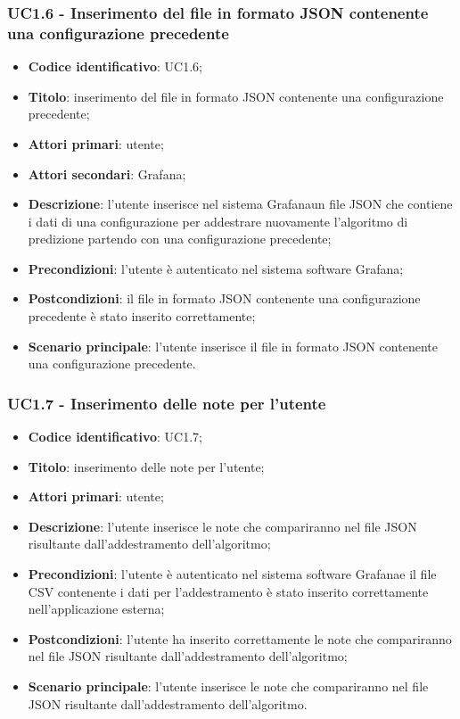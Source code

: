 \subsubsection{UC1.6 - Inserimento del file in formato JSON contenente una configurazione precedente}
\begin{itemize}
	\item \textbf{Codice identificativo}: UC1.6;
	\item \textbf{Titolo}: inserimento del file in formato JSON contenente una configurazione precedente;
	\item \textbf{Attori primari}: utente;
	\item \textbf{Attori secondari}: Grafana\glo;
	\item \textbf{Descrizione}: l'utente inserisce nel sistema Grafana\glosp un file JSON che contiene i dati di una configurazione per addestrare nuovamente l'algoritmo di predizione partendo con una configurazione precedente;
	\item \textbf{Precondizioni}: l'utente è autenticato nel sistema software Grafana\glo;
	\item \textbf{Postcondizioni}: il file in formato JSON contenente una configurazione precedente è stato inserito correttamente;
	\item \textbf{Scenario principale}: l'utente inserisce il file in formato JSON contenente una configurazione precedente.
\end{itemize}
\subsubsection{UC1.7 - Inserimento delle note per l'utente}
\begin{itemize}
	\item \textbf{Codice identificativo}: UC1.7;
	\item \textbf{Titolo}: inserimento delle note per l'utente;
	\item \textbf{Attori primari}: utente;
	\item \textbf{Descrizione}: l'utente inserisce le note che compariranno nel file JSON risultante dall'addestramento dell'algoritmo;
	\item \textbf{Precondizioni}: l'utente è autenticato nel sistema software Grafana\glosp e il file CSV contenente i dati per l'addestramento è stato inserito correttamente nell'applicazione esterna;
	\item \textbf{Postcondizioni}: l'utente ha inserito correttamente le note che compariranno nel file JSON risultante dall'addestramento dell'algoritmo;
	\item \textbf{Scenario principale}: l'utente inserisce le note che compariranno nel file JSON risultante dall'addestramento dell'algoritmo.
\end{itemize}
